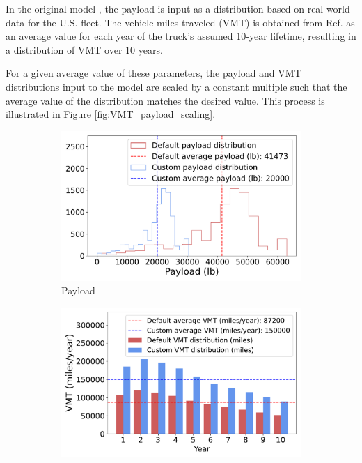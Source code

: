 In the original model \cite{Sader_2023}, the payload is input as a distribution based on real-world data \cite{zabelsky2002economic} for the U.S. fleet. The vehicle miles traveled (VMT) is obtained from Ref. \cite{osti_1780970} as an average value for each year of the truck's assumed 10-year lifetime, resulting in a distribution of VMT over 10 years.  

For a given average value of these parameters, the payload and VMT distributions input to the model are scaled by a constant multiple such that the average value of the distribution matches the desired value. This process is illustrated in Figure \ref{fig:VMT_payload_scaling}.

\begin{figure}[H]
    \centering
    \begin{subfigure}[b]{0.49\textwidth}
        \centering
        \includegraphics[width=\textwidth]{figures/payload_distribution_average_20000lb.pdf}
        \caption{Payload}
        \label{fig:payload_distribution}
    \end{subfigure}
    \hfill
    \begin{subfigure}[b]{0.49\textwidth}
        \centering
        \includegraphics[width=\textwidth]{figures/VMT_distribution_average_150000.pdf}

\end{subfigure}
\end{figure}
